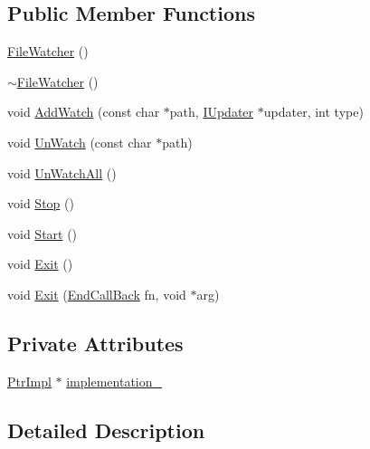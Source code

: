 \subsection*{Public Member Functions}
\begin{DoxyCompactItemize}
\item 
\hyperlink{classmocha_1_1_file_watcher_a844bd44469e6657fb7d5157ec7403f08}{FileWatcher} ()
\item 
\hyperlink{classmocha_1_1_file_watcher_a5761437d128835c8f6a9a96ddf14351b}{$\sim$FileWatcher} ()
\item 
void \hyperlink{classmocha_1_1_file_watcher_a27735bd6c3a3816c7ee8de68ce26365f}{AddWatch} (const char $\ast$path, \hyperlink{classmocha_1_1_i_updater}{IUpdater} $\ast$updater, int type)
\item 
void \hyperlink{classmocha_1_1_file_watcher_a06618480535f0aae1db8aabcd0785499}{UnWatch} (const char $\ast$path)
\item 
void \hyperlink{classmocha_1_1_file_watcher_a066c2a274e6cc679dfe6fb8d9729479f}{UnWatchAll} ()
\item 
void \hyperlink{classmocha_1_1_file_watcher_a272b7e7191a7284fa9d7fc15e32c7c29}{Stop} ()
\item 
void \hyperlink{classmocha_1_1_file_watcher_a264fca346886478a26b85d62f0b94fa5}{Start} ()
\item 
void \hyperlink{classmocha_1_1_file_watcher_a0f9fe45b54126ac93e864b8f2d3c1537}{Exit} ()
\item 
void \hyperlink{classmocha_1_1_file_watcher_a1585a6ee12afffb9c661eaddd7ef4c66}{Exit} (\hyperlink{classmocha_1_1_file_watcher_af774b8dd436b9f8929506466533831b9}{EndCallBack} fn, void $\ast$arg)
\end{DoxyCompactItemize}
\subsection*{Private Attributes}
\begin{DoxyCompactItemize}
\item 
\hyperlink{classmocha_1_1_file_watcher_1_1_ptr_impl}{PtrImpl} $\ast$ \hyperlink{classmocha_1_1_file_watcher_ab1a22ac85de2c9c929167abe785a00c5}{implementation\_\-}
\end{DoxyCompactItemize}


\subsection{Detailed Description}



